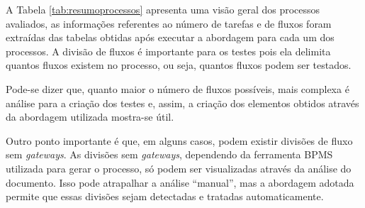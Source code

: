 \documentclass[12pt]{article}
\begin{document}
A Tabela \ref{tab:resumoprocessos} apresenta uma visão geral dos processos avaliados, as informações referentes ao número de tarefas e de fluxos foram extraídas das tabelas obtidas após executar a abordagem para cada um dos processos. A divisão de fluxos é importante para os testes pois ela delimita quantos fluxos existem no processo, ou seja, quantos fluxos podem ser testados.
 
\begin{table}[]
\centering
\caption{Resumo dos processos avaliados}
\label{tab:resumoprocessos}
\end{table}


 Pode-se dizer que, quanto maior o número de fluxos possíveis, mais complexa é análise para a criação dos testes e, assim, a criação dos elementos obtidos através da abordagem utilizada mostra-se útil.
 
 Outro ponto importante é que, em alguns casos, podem existir divisões de fluxo sem \emph{gateways}. As divisões sem \emph{gateways}, dependendo da ferramenta BPMS utilizada para gerar o processo, só podem ser visualizadas através da análise do documento. Isso pode atrapalhar a análise ``manual'', mas a abordagem adotada permite que essas divisões sejam detectadas e tratadas automaticamente.
\end{document}
